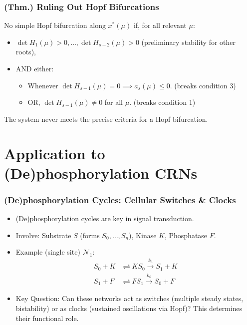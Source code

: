 \documentclass[aspectratio=169]{beamer}
\begin{document}
\begin{frame}{\insertsectionhead}
	\frametitle{(Thm.) Ruling Out Hopf Bifurcations}
	No simple Hopf bifurcation along $x^*(\mu)$ if, for all relevant $\mu$:
	\begin{itemize}
		\item $\det H_1(\mu) > 0, \dots, \det H_{s-2}(\mu) > 0$ (preliminary stability for other roots),
		\item AND either:
			\begin{itemize}
				\item Whenever $\det H_{s-1}(\mu) = 0 \implies a_s(\mu) \le 0$. (breaks condition 3)
				\item OR, $\det H_{s-1}(\mu) \neq 0$ for all $\mu$. (breaks condition 1)
			\end{itemize}
	\end{itemize}
	The system never meets the precise criteria for a Hopf bifurcation.
\end{frame}

\section{Application to (De)phosphorylation CRNs}

\begin{frame}{\insertsectionhead}
	\frametitle{(De)phosphorylation Cycles: Cellular Switches \& Clocks}
	\begin{itemize}
		\item (De)phosphorylation cycles are key in \alert{signal transduction}.
		\item Involve: Substrate $S$ (forms $S_0, \dots, S_n$), Kinase $K$, Phosphatase $F$.
		\item Example (single site) $\mathcal{N}_1$:
			\begin{align*}
				S_0 + K &\rightleftharpoons KS_0 \xrightarrow{k_3} S_1 + K \\
				S_1 + F &\rightleftharpoons FS_1 \xrightarrow{k_6} S_0 + F
			\end{align*}
		\item \alert{Key Question}: Can these networks act as \alert{switches} (multiple steady states, bistability) or as \alert{clocks} (sustained oscillations via Hopf)? This determines their functional role.
	\end{itemize}
\end{frame}
\end{document}
